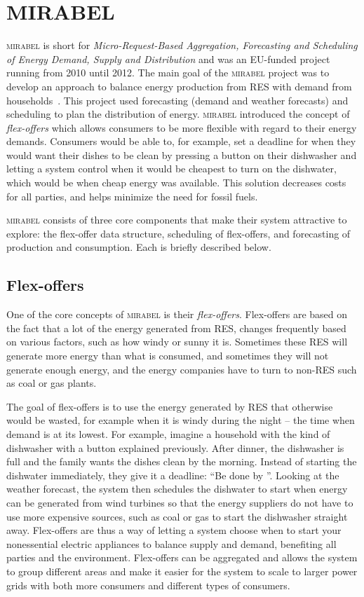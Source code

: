 \section{MIRABEL}\label{sec:MIRABEL}
\textsc{mirabel} is short for \emph{Micro-Request-Based Aggregation, Forecasting and Scheduling of Energy Demand, Supply and Distribution} and was an EU-funded project running from 2010 until 2012. The main goal of the \textsc{mirabel} project was to develop an approach to balance energy production from RES with demand from households~\cite{MIRABEL}. This project used forecasting (demand and weather forecasts) and scheduling to plan the distribution of energy. \textsc{mirabel} introduced the concept of \emph{flex-offers} which allows consumers to be more flexible with regard to their energy demands. Consumers would be able to, for example, set a deadline for when they would want their dishes to be clean by pressing a button on their dishwasher and letting a system control when it would be cheapest to turn on the dishwater, which would be when cheap energy was available. This solution decreases costs for all parties, and helps minimize the need for fossil fuels. 

\textsc{mirabel} consists of three core components that make their system attractive to explore: the flex-offer data structure, scheduling of flex-offers, and forecasting of production and consumption. Each is briefly described below.

\subsection{Flex-offers}\label{sec:flexoffer}
One of the core concepts of \textsc{mirabel} is their \emph{flex-offers}. Flex-offers are based on the fact that a lot of the energy generated from RES, changes frequently based on various factors, such as how windy or sunny it is. Sometimes these RES will generate more energy than what is consumed, and sometimes they will not generate enough energy, and the energy companies have to turn to non-RES such as coal or gas plants.

The goal of flex-offers is to use the energy generated by RES that otherwise would be wasted, for example when it is windy during the night -- the time when demand is at its lowest. For example, imagine a household with the kind of dishwasher with a button explained previously. After dinner, the dishwasher is full and the family wants the dishes clean by the morning. Instead of starting the dishwater immediately, they give it a deadline: ``Be done by ''. Looking at the weather forecast, the system then schedules the dishwater to start when energy can be generated from wind turbines so that the energy suppliers do not have to use more expensive sources, such as coal or gas to start the dishwasher straight away. Flex-offers are thus a way of letting a system choose when to start your nonessential electric appliances to balance supply and demand, benefiting all parties and the environment. Flex-offers can be aggregated and allows the system to group different areas and make it easier for the system to scale to larger power grids with both more consumers and different types of consumers.

